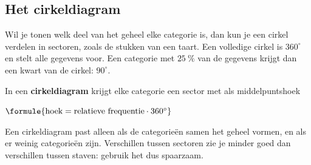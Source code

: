 \begin{oefeningen}
\end{oefeningen}

\subsection{Het cirkeldiagram}

Wil je tonen welk deel van het geheel elke categorie is, dan kun je een cirkel verdelen in sectoren, zoals de stukken van een taart. Een volledige cirkel is $360^\circ$ en stelt alle gegevens voor. Een categorie met $25~\%$ van de gegevens krijgt dan een kwart van de cirkel: $90^\circ$.

\begin{theorie}
In een \textbf{\textcolor{accent}{cirkeldiagram}} krijgt elke categorie een sector met als middelpuntshoek

\vspace{1mm}
\qquad $\formule{\text{hoek} = \text{relatieve frequentie} \cdot 360^\circ}$
\end{theorie}

Een cirkeldiagram past alleen als de categorieën samen het geheel vormen, en als er weinig categorieën zijn. Verschillen tussen sectoren zie je minder goed dan verschillen tussen staven: gebruik het dus spaarzaam.


